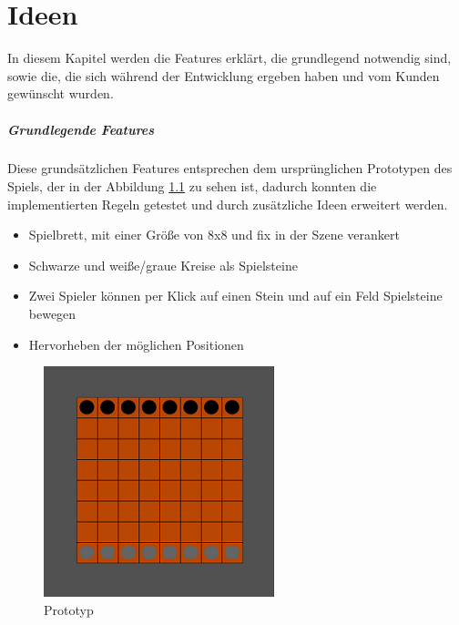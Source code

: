 
\chapter{Ideen}
\label{ch:Entwurf}
In diesem Kapitel werden die Features erklärt, die grundlegend notwendig sind, sowie die, die sich während der Entwicklung ergeben haben und vom Kunden gewünscht wurden.

\label{ch:Entwurf:sec:1.Konzept}
\paragraph{Grundlegende Features}
 Diese grundsätzlichen Features entsprechen dem ursprünglichen Prototypen des Spiels, der in der Abbildung \ref{fig:Prototyp} zu sehen ist, dadurch konnten die implementierten Regeln getestet und durch  zusätzliche Ideen erweitert werden.
 	\begin{itemize}
 		\item Spielbrett, mit einer Größe von 8x8 und fix in der Szene verankert
 		\item Schwarze und weiße/graue Kreise als Spielsteine
 		\item Zwei Spieler können per Klick auf einen Stein und auf ein Feld Spielsteine bewegen
 		\item Hervorheben der möglichen Positionen
 	\end{itemize}
\begin{figure}[h]
	\centering
	\includegraphics{img/Prototyp2}
	\caption{Prototyp}
	\label{fig:Prototyp}
\end{figure}

